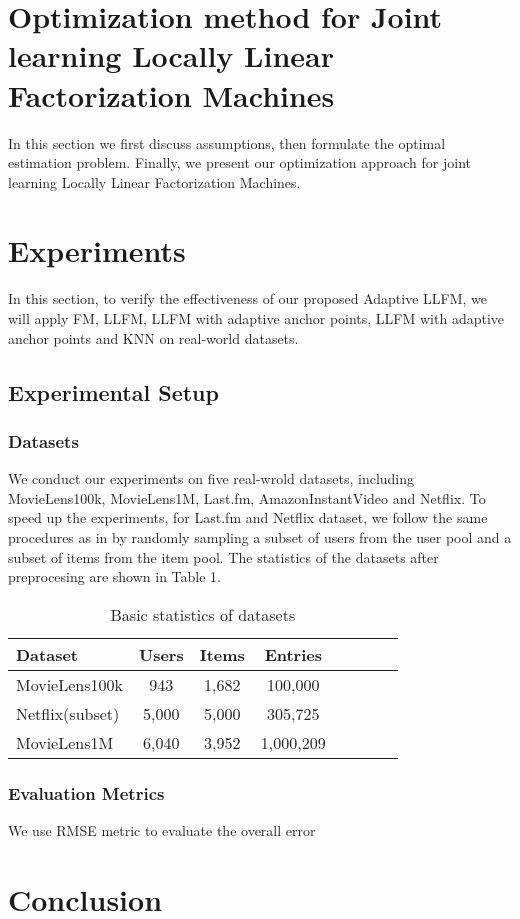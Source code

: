 \documentclass{article}
\begin{document}
\section{Optimization method for Joint learning Locally Linear Factorization Machines}
In this section we first discuss assumptions, then formulate the optimal estimation problem. Finally, we present our optimization approach for joint learning Locally Linear Factorization Machines.

\section{Experiments}
In this section, to verify the effectiveness of our proposed Adaptive LLFM, we will apply FM, LLFM, LLFM with adaptive anchor points, LLFM with adaptive anchor points and KNN on real-world datasets.
\subsection{Experimental Setup}
\subsubsection{Datasets}
We conduct our experiments on five real-wrold datasets, including MovieLens100k, MovieLens1M, Last.fm, AmazonInstantVideo and Netflix. To speed up the experiments, for Last.fm and Netflix dataset, we follow the same procedures as in \cite{pan2013gbpr} by randomly sampling a subset of users from the user pool and a subset of items from the item pool. The statistics of the datasets after preprocesing are shown in Table 1.
\begin{table}
	\caption{Basic statistics of datasets}
	\begin{tabular}{l*{6}{c}r}
		\hline
		Dataset              & Users & Items & Entries \\
		\hline
		MovieLens100k 		   	& 943 & 1,682 & 100,000  \\
		Netflix(subset)     	& 5,000 & 5,000 & 305,725   \\
		MovieLens1M            	& 6,040 & 3,952 & 1,000,209  \\
	\end{tabular}
\end{table}
\subsubsection{Evaluation Metrics}
We use RMSE metric to evaluate the overall error 
\section{Conclusion}


\end{document}
